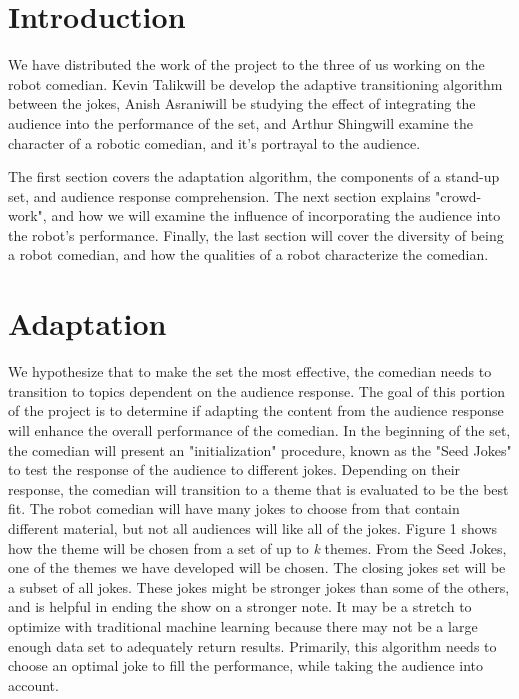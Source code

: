 \documentclass[onecolumn, draftclsnofoot,10pt, compsoc]{IEEEtran}
\def \GroupMemberOne{     Arthur Shing}
\def \GroupMemberTwo{			Kevin Talik}
\def \GroupMemberThree{   Anish Asrani}
\begin{document}
\section{Introduction}
  We have distributed the work of the project to the three of us working on the robot comedian. \GroupMemberTwo will be develop the adaptive transitioning algorithm between the jokes, \GroupMemberThree will be studying the effect of integrating the audience into the performance of the set, and \GroupMemberOne will examine the character of a robotic comedian, and it's portrayal to the audience.

  The first section covers the adaptation algorithm, the components of a stand-up set, and audience response comprehension. The next section explains "crowd-work", and how we will examine the influence of incorporating the audience into the robot's performance. Finally, the last section will cover the diversity of being a robot comedian, and how the qualities of a robot characterize the comedian.

\section{Adaptation}
  We hypothesize that to make the set the most effective, the comedian needs to transition to topics dependent on the audience response. The goal of this portion of the project is to determine if adapting the content from the audience response will enhance the overall performance of the comedian. In the beginning of the set, the comedian will present an "initialization" procedure, known as the "Seed Jokes" to test the response of the audience to different jokes. Depending on their response, the comedian will transition to a theme that is evaluated to be the best fit. The robot comedian will have many jokes to choose from that contain different material, but not all audiences will like all of the jokes. Figure 1 shows how the theme will be chosen from a set of up to \textit{k} themes. From the Seed Jokes, one of the themes we have developed will be chosen. The closing jokes set will be a subset of all jokes. These jokes might be stronger jokes than some of the others, and is helpful in ending the show on a stronger note. It may be a stretch to optimize with traditional machine learning because there may not be a large enough data set to adequately return results. Primarily, this algorithm needs to choose an optimal joke to fill the performance, while taking the audience into account.
\end{document}
